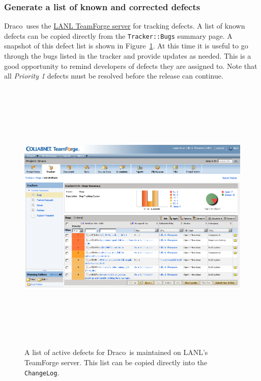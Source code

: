 \documentclass[note]{newmemo}
\newcommand{\draco}{{\normalfont\small\sffamily Draco}}
\begin{document}

\subsubsection{Generate a list of known and corrected defects}
\label{sec:list_of_defects}

\draco\ uses the \href{https://tf.lanl.gov}{LANL TeamForge server} for
tracking defects.  A list of known defects can be copied directly from
the \texttt{Tracker::Bugs} summary page.  A snapshot of this defect
list is shown in Figure~\ref{fig:sample-bug-itemization-on-tf}. At
this time it is useful to go through the bugs listed in the tracker
and provide updates as needed.  This is a good opportunity to remind
developers of defects they are assigned to.  Note that all
\textit{Priority 1} defects must be resolved before the release can
continue.

\begin{figure}
  \centerline{ \includegraphics[height=5.25in, angle=90]
{sample-bug-itemization-on-tf.png}}
  \caption{A list of active defects for \draco\ is maintained on
    LANL's TeamForge server.  This list can be copied directly into
    the \texttt{ChangeLog}.}
  \label{fig:sample-bug-itemization-on-tf}
\end{figure}
\end{document}
